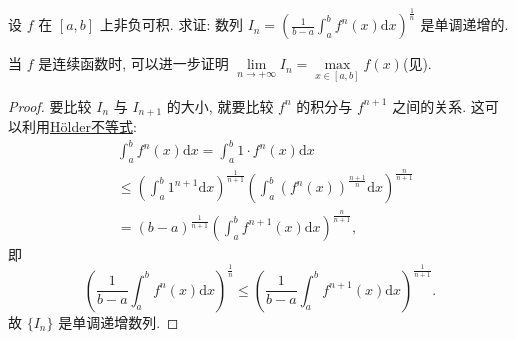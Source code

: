 \documentclass[../../main.tex]{subfiles}%
\begin{document}
\begin{example}
设 $f$ 在 $[a,b]$ 上非负可积. 求证: 数列 $I_n=\left(\frac{1}{b-a}\int_a^b f^n(x)\mathrm{d}x\right)^{\frac{1}{n}}$ 是单调递增的.
\end{example}
\begin{remark}
当 $f$ 是连续函数时, 可以进一步证明 $\lim\limits_{n\to+\infty}I_n=\max\limits_{x\in[a,b]}f(x)$(见).
\end{remark}
\begin{proof}
要比较 $I_n$ 与 $I_{n+1}$ 的大小, 就要比较 $f^n$ 的积分与 $f^{n+1}$ 之间的关系. 这可以利用\hyperref[theorem:Hölder(H\"older)不等式(积分形式)]{Hölder不等式}:
$$
\begin{aligned}
&\int_a^b f^n(x)\mathrm{d}x = \int_a^b 1\cdot f^n(x)\mathrm{d}x \\
&\leqslant  \left(\int_a^b 1^{n+1}\mathrm{d}x\right)^{\frac{1}{n+1}} \left(\int_a^b (f^n(x))^{\frac{n+1}{n}}\mathrm{d}x\right)^{\frac{n}{n+1}} \\
&= (b-a)^{\frac{1}{n+1}} \left(\int_a^b f^{n+1}(x)\mathrm{d}x\right)^{\frac{n}{n+1}},
\end{aligned}
$$
即
$$\left(\frac{1}{b-a}\int_a^b f^n(x)\mathrm{d}x\right)^{\frac{1}{n}} \leqslant  \left(\frac{1}{b-a}\int_a^b f^{n+1}(x)\mathrm{d}x\right)^{\frac{1}{n+1}}.$$
故 $\{I_n\}$ 是单调递增数列.
\end{proof}
\end{document}

